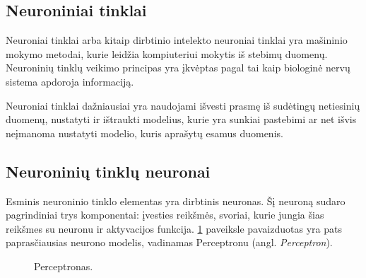 %
%

\subsection{Neuroniniai tinklai}
Neuroniai tinklai arba kitaip dirbtinio intelekto neuroniai tinklai yra mašininio mokymo metodai, kurie leidžia kompiuteriui mokytis iš stebimų duomenų. Neuroninių tinklų veikimo principas yra įkvėptas pagal tai kaip biologinė nervų sistema apdoroja informaciją.\cite{Sukhadeve2017}

Neuroniai tinklai dažniausiai yra naudojami išvesti prasmę iš sudėtingų netiesinių duomenų, nustatyti ir ištraukti modelius, kurie yra sunkiai pastebimi ar net išvis neįmanoma nustatyti modelio, kuris aprašytų esamus duomenis.\cite{Sukhadeve2017}



\subsection{Neuroninių tinklų neuronai}

Esminis neuroninio tinklo elementas yra dirbtinis neuronas. Šį neuroną sudaro pagrindiniai trys komponentai: įvesties reikšmės, svoriai, kurie jungia šias reikšmes su neuronu ir aktyvacijos funkcija. \ref{fig:perceptron1} paveiksle pavaizduotas yra pats paprasčiausias neurono modelis, vadinamas Perceptronu (angl. \textit{Perceptron}).\cite{Andrew2017}

\begin{figure}[h!]
  \centering
{}
\caption{Perceptronas.}
\label{fig:perceptron1}
\end{figure}


